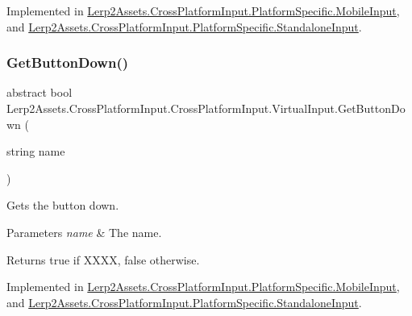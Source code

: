 Implemented in \hyperlink{class_lerp2_assets_1_1_cross_platform_input_1_1_platform_specific_1_1_mobile_input_a66bcbe807c0fd99c889d607e82e41cdb}{Lerp2\+Assets.\+Cross\+Platform\+Input.\+Platform\+Specific.\+Mobile\+Input}, and \hyperlink{class_lerp2_assets_1_1_cross_platform_input_1_1_platform_specific_1_1_standalone_input_aa54949ca8bdb75bec799a40267626108}{Lerp2\+Assets.\+Cross\+Platform\+Input.\+Platform\+Specific.\+Standalone\+Input}.

\mbox{\label{class_lerp2_assets_1_1_cross_platform_input_1_1_cross_platform_input_1_1_virtual_input_a0e032fff9d6abc32017cee10d69d32d4}} 
\subsubsection{\texorpdfstring{Get\+Button\+Down()}{GetButtonDown()}}
{\footnotesize\ttfamily abstract bool Lerp2\+Assets.\+Cross\+Platform\+Input.\+Cross\+Platform\+Input.\+Virtual\+Input.\+Get\+Button\+Down (\begin{DoxyParamCaption}\item[{string}]{name }\end{DoxyParamCaption})\hspace{0.3cm}{\ttfamily [pure virtual]}}



Gets the button down. 


\begin{DoxyParams}{Parameters}
{\em name} & The name.\\
\hline
\end{DoxyParams}
\begin{DoxyReturn}{Returns}
{\ttfamily true} if X\+X\+XX, {\ttfamily false} otherwise.
\end{DoxyReturn}


Implemented in \hyperlink{class_lerp2_assets_1_1_cross_platform_input_1_1_platform_specific_1_1_mobile_input_a9a81455fe6915c40f681195ff19a769c}{Lerp2\+Assets.\+Cross\+Platform\+Input.\+Platform\+Specific.\+Mobile\+Input}, and \hyperlink{class_lerp2_assets_1_1_cross_platform_input_1_1_platform_specific_1_1_standalone_input_aa6202d5f426869304b8d8c4f7747c82c}{Lerp2\+Assets.\+Cross\+Platform\+Input.\+Platform\+Specific.\+Standalone\+Input}.

